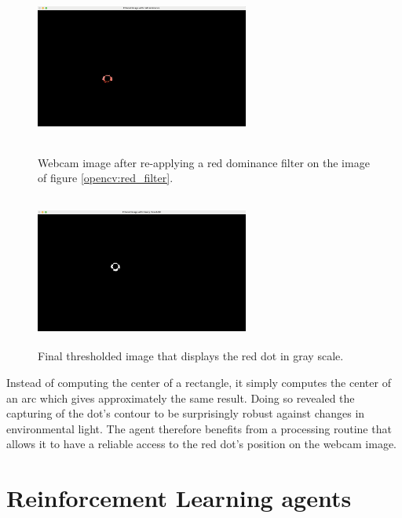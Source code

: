 \begin{figure}[H]

  \begin{minipage}[b]{0.45\linewidth}
   \centering
   \includegraphics[width=7cm,height=5cm]{Images/additional_red_filter.png}
   \caption{Webcam image after re-applying a red dominance filter on the image of figure \ref{opencv:red_filter}.}
   \label{opencv:add_filter}
  \end{minipage}
\hfill
  \begin{minipage}[b]{0.45\linewidth}
   \centering
   \includegraphics[width=7cm,height=5cm]{Images/threshold.png}
   \caption{Final thresholded image that displays the red dot in gray scale.}
   \label{opencv:threshold}
  \end{minipage}
\end{figure}

Instead of computing the center of a rectangle, it simply computes the center of an arc which gives approximately the same result. Doing so revealed the capturing of the dot's contour to be surprisingly robust against changes in environmental light. The agent therefore benefits from a processing routine \texttt{} that allows it to have a reliable access to the red dot's position on the webcam image.

\section{Reinforcement Learning agents}

